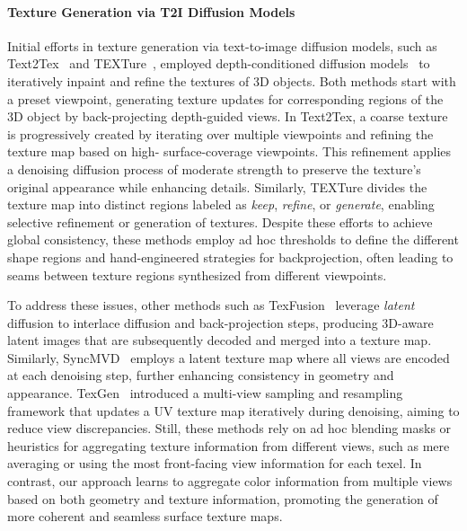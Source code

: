 \paragraph{Texture Generation via T2I Diffusion Models}
Initial efforts in texture generation via text-to-image diffusion models, such as 
Text2Tex~\cite{Chen:2023:Text2tex} and TEXTure~\cite{Richardson:2023:Texture}, employed depth-conditioned 
diffusion models~\cite{Rombach:2022:High, Zhang:2023:ControlNet} to iteratively inpaint and refine the 
textures of 3D objects. Both methods start with a preset viewpoint, generating texture updates for 
corresponding regions of the 3D object by back-projecting depth-guided views. In Text2Tex, a coarse texture 
is progressively created by iterating over multiple viewpoints and refining the texture map based on high-
surface-coverage viewpoints. This refinement applies a denoising diffusion process of moderate strength to 
preserve the texture’s original appearance while enhancing details. Similarly, TEXTure divides the texture 
map into distinct regions labeled as \textit{keep}, \textit{refine}, or \textit{generate}, enabling 
selective refinement or generation of textures. Despite these efforts to achieve global consistency, these methods employ ad hoc thresholds to define the different shape regions and hand-engineered strategies for backprojection, often leading to seams between texture regions synthesized from different viewpoints.  


To address these issues, other methods such as TexFusion~\cite{Cao:2023:Texfusion} leverage 
\textit{latent} diffusion to interlace diffusion and back-projection steps, producing 3D-aware 
latent images that are subsequently decoded and merged into a texture map. Similarly, 
SyncMVD~\cite{Liu:2024:SyncMVD} employs a latent texture map where all views are encoded at each 
denoising step, further enhancing consistency in geometry and appearance. TexGen~\cite{Huo:2024:TexGen} introduced a multi-view sampling and resampling framework 
that updates a UV texture map iteratively during denoising, aiming to reduce view discrepancies.
Still, these methods rely on ad hoc blending masks or heuristics for aggregating texture information from different views, such as mere averaging or using the most front-facing view information for each texel.
 In contrast, our approach learns to aggregate color information from multiple views based on both geometry and texture information, promoting the generation of more coherent and seamless surface texture maps.


